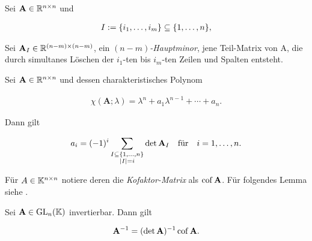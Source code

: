             \begin{definition} \label{def:principal_minors}

                Sei $\mathbf A \in \mathbb R^{n \times n}$ und

                \begin{align*}
                    I
                    :=
                    {\left \{ i_1, \dots, i_m \right \}}
                    \subseteq
                    {\left \{ 1, \dots, n \right \}},
                \end{align*}

                Sei $\mathbf A_I \in \mathbb R^{(n-m) \times (n-m)}$, ein \textit{$(n-m)$-Hauptminor}, jene Teil-Matrix von $\mathrm A$, die durch simultanes Löschen der $i_1$-ten bis $i_m$-ten Zeilen und Spalten entsteht.

            \end{definition}

            \begin{lemma} \label{lem:characteristic_coefficints}

                Sei $\mathbf A \in \mathbb R^{n \times n}$ und dessen charakteristisches Polynom

                \begin{align*}
                    \chi(\mathbf A; \lambda)
                    =
                    \lambda^n + a_1 \lambda^{n-1} + \cdots + a_n.
                \end{align*}

                Dann gilt

                \begin{align*}
                    a_i
                    =
                    (-1)^i
                    \sum_{\substack{I \subseteq {\left \{ 1, \dots, n \right \}} \\ |I| = i}}
                        \det \mathbf A_I
                    \quad
                    \text{für}
                    \quad
                    i = 1, \dots, n.
                \end{align*}

            \end{lemma}

            Für $A \in \mathbb K^{n \times n}$ notiere deren die \textit{Kofaktor-Matrix} als $\operatorname{cof} \mathbf A$.
            Für folgendes Lemma siehe \cite[Kapitel 7.5]{LinAG1&2}.

            \begin{lemma} \label{lem:cofactor_inverse}

                Sei $\mathbf A \in \operatorname{GL}_n(\mathbb K)$ invertierbar.
                Dann gilt

                \begin{align*}
                    \mathbf A^{-1} = (\det \mathbf A)^{-1} \operatorname{cof} \mathbf A.
                \end{align*}

            \end{lemma}

